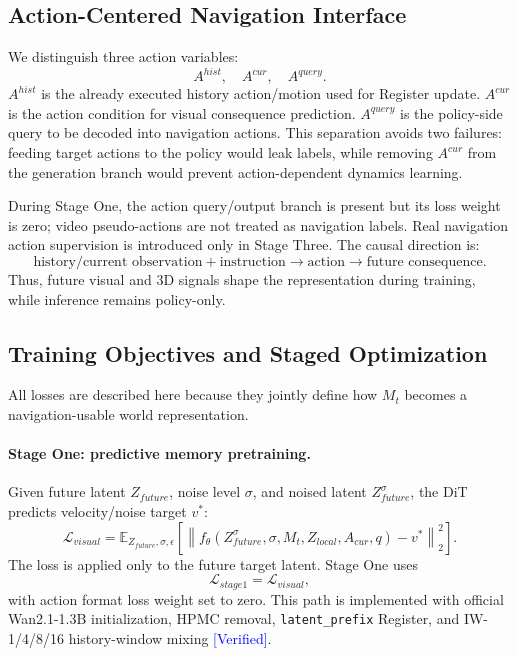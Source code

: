 \documentclass[11pt,a4paper]{ctexart}
\newcommand{\verified}{\textcolor{blue}{[Verified]}}
\begin{document}
\subsection{Action-Centered Navigation Interface}

We distinguish three action variables:
\[
A^{hist}, \quad A^{cur}, \quad A^{query}.
\]
\(A^{hist}\) is the already executed history action/motion used for Register update. \(A^{cur}\) is the action condition for visual consequence prediction. \(A^{query}\) is the policy-side query to be decoded into navigation actions. This separation avoids two failures: feeding target actions to the policy would leak labels, while removing \(A^{cur}\) from the generation branch would prevent action-dependent dynamics learning.

During Stage One, the action query/output branch is present but its loss weight is zero; video pseudo-actions are not treated as navigation labels. Real navigation action supervision is introduced only in Stage Three. The causal direction is:
\[
\text{history/current observation} + \text{instruction}
\rightarrow
\text{action}
\rightarrow
\text{future consequence}.
\]
Thus, future visual and 3D signals shape the representation during training, while inference remains policy-only.

\subsection{Training Objectives and Staged Optimization}

All losses are described here because they jointly define how \(M_t\) becomes a navigation-usable world representation.

\paragraph{Stage One: predictive memory pretraining.}
Given future latent \(Z_{future}\), noise level \(\sigma\), and noised latent \(Z^\sigma_{future}\), the DiT predicts velocity/noise target \(v^\ast\):
\[
\mathcal{L}_{visual}
=
\mathbb{E}_{Z_{future},\sigma,\epsilon}
\left[
\left\|
f_\theta(Z^\sigma_{future}, \sigma, M_t, Z_{local}, A_{cur}, q)
- v^\ast
\right\|_2^2
\right].
\]
The loss is applied only to the future target latent. Stage One uses
\[
\mathcal{L}_{stage1}=\mathcal{L}_{visual},
\]
with action format loss weight set to zero. This path is implemented with official Wan2.1-1.3B initialization, HPMC removal, \texttt{latent\_prefix} Register, and IW-1/4/8/16 history-window mixing \verified{}.
\end{document}
